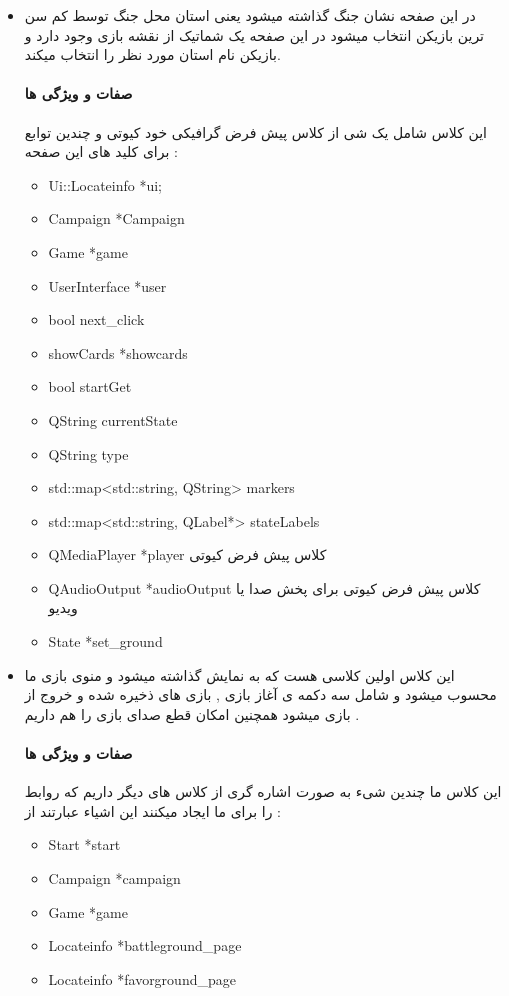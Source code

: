 \documentclass[pdf,titlepage,a4paper]{report}
\begin{document}
\begin{itemize}
		\item {}  در این صفحه نشان جنگ گذاشته میشود یعنی استان محل جنگ توسط کم سن ترین بازیکن انتخاب میشود در این صفحه یک شماتیک از نقشه بازی وجود دارد و بازیکن نام استان مورد نظر را انتخاب میکند.\\
		\paragraph{صفات و ویژگی ها} 
         این کلاس شامل یک شی از کلاس پیش فرض گرافیکی خود کیوتی و چندین توابع برای کلید های این صفحه :
		\begin{latin}
			\begin{itemize}
				\item Ui::Locateinfo *ui;
				\item Campaign *Campaign
				\item Game *game
				\item UserInterface *user
				\item bool next_click
				\item showCards *showcards
				\item bool startGet
				\item QString currentState
				\item QString type
				\item std::map<std::string, QString> markers
				\item std::map<std::string, QLabel*> stateLabels
				\item QMediaPlayer *player  کلاس پیش فرض کیوتی 
				\item QAudioOutput *audioOutput  کلاس پیش فرض کیوتی برای پخش صدا یا ویدیو
				\item State *set_ground  

			\end{itemize}

		\end{latin} 

		\item {}  این کلاس اولین کلاسی هست که به نمایش گذاشته میشود و منوی بازی ما محسوب میشود و شامل سه دکمه ی آغاز بازی , بازی های ذخیره شده و خروج از بازی میشود همچنین امکان قطع صدای بازی را هم داریم .\\
		\paragraph{صفات و ویژگی ها} 
         این کلاس ما چندین شیء به صورت اشاره گری از کلاس های دیگر داریم که روابط را برای ما ایجاد میکنند این اشیاء عبارتند از :
		\begin{latin}
			\begin{itemize}
				\item Start *start
				\item Campaign *campaign
				\item Game *game
				\item Locateinfo *battleground_page
				\item Locateinfo *favorground_page
			\end{itemize}
		\end{latin}
		

\end{itemize}
\end{document}
